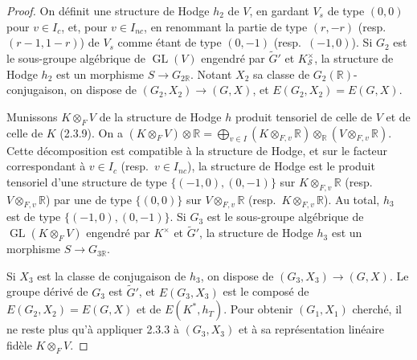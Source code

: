 \documentclass[12pt,a4paper]{article}
\theoremstyle{plain}
\theoremstyle{definition}
\theoremstyle{remark}
\DeclareMathOperator{\GL}{GL}
\newcommand{\RR}{\mathbb{R}}
\begin{document}
\begin{proof}
On d\'efinit une structure de Hodge $h_2$ de $V$, en gardant $V_s$ de type $(0,0)$ pour $v \in I_c$, et, pour $v \in I_{nc}$, en renommant la partie de type $(r,-r)$ (resp.~$(r-1,1-r)$) de $V_s$ comme \'etant de type $(0,-1)$ (resp.~$(-1,0)$). Si $G_2$ est le sous-groupe alg\'ebrique de $\GL(V)$ engendr\'e par $\tilde{G}'$ et $K_\mathcal{S}^{\times}$, la structure de Hodge $h_2$ est un morphisme $S \to G_{2\RR}$. Notant $X_2$ sa classe de $G_2(\RR)$-conjugaison, on dispose de $(G_2,X_2) \to (G,X)$, et $E(G_2,X_2) = E(G,X)$.

Munissons $K \otimes_F V$ de la structure de Hodge $h$ produit tensoriel de celle de $V$ et de celle de $K$ (2.3.9). On a $(K \otimes_F V) \otimes \RR = \bigoplus_{v \in I} (K \otimes_{F,v} \RR) \otimes_\RR (V \otimes_{F,v} \RR)$. Cette d\'ecomposition est compatible \`a la structure de Hodge, et sur le facteur correspondant \`a $v \in I_c$ (resp.~$v \in I_{nc}$), la structure de Hodge est le produit tensoriel d'une structure de type $\{(-1,0),(0,-1)\}$ sur $K \otimes_{F,v} \RR$ (resp.~$V \otimes_{F,v} \RR$) par une de type $\{(0,0)\}$ sur $V \otimes_{F,v} \RR$ (resp.~$K \otimes_{F,v} \RR$). Au total, $h_3$ est de type $\{(-1,0),(0,-1)\}$. Si $G_3$ est le sous-groupe alg\'ebrique de $\GL(K \otimes_F V)$ engendr\'e par $K^{\times}$ et $\tilde{G}'$, la structure de Hodge $h_3$ est un morphisme $S \to G_{3\RR}$.

Si $X_3$ est la classe de conjugaison de $h_3$, on dispose de $(G_3,X_3) \to (G,X)$. Le groupe d\'eriv\'e de $G_3$ est $\tilde{G}'$, et $E(G_3,X_3)$ est le compos\'e de $E(G_2,X_2) = E(G,X)$ et de $E(K^*,h_T)$. Pour obtenir $(G_1,X_1)$ cherch\'e, il ne reste plus qu'\`a appliquer 2.3.3 \`a $(G_3,X_3)$ et \`a sa repr\'esentation lin\'eaire fid\`ele $K \otimes_F V$.
\end{proof}
\end{document}
